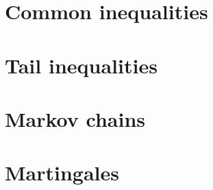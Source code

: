 \section{Common inequalities}
\section{Tail inequalities}
\section{Markov chains}
\section{Martingales}